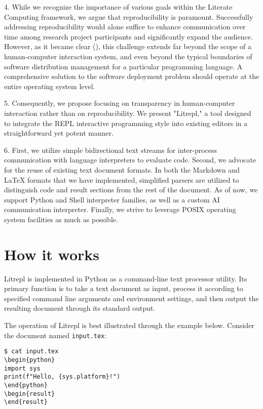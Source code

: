 \documentclass[a4paper,12pt,twocolumn]{article}
\begin{document}
4. While we recognize the importance of various goals within the Literate
Computing framework, we argue that reproducibility is paramount. Successfully
addressing reproducibility would alone suffice to enhance communication over
time among research project participants and significantly expand the audience.
However, as it became clear (\cite{Dolstra2010, Vallet2022}), this challenge
extends far beyond the scope of a human-computer interaction system, and even
beyond the typical boundaries of software distribution management for a
particular programming language. A comprehensive solution to the software
deployment problem should operate at the entire operating system level.


5. Consequently, we propose focusing on transparency in human-computer
interaction rather than on reproducibility. We present "Litrepl," a tool
designed to integrate the REPL interactive programming style into existing
editors in a straightforward yet potent manner.

6. First, we utilize simple bidirectional text streams for inter-process
communication with language interpreters to evaluate code. Second, we advocate
for the reuse of existing text document formats. In both the Markdown and LaTeX
formats that we have implemented, simplified parsers are utilized to distinguish
code and result sections from the rest of the document. As of now, we support
Python and Shell interpreter families, as well as a custom AI communication
interpreter. Finally, we strive to leverage POSIX \cite{POSIX2024} operating
system facilities as much as possible.


\section{How it works}

Litrepl is implemented in Python as a command-line text processor utility. Its
primary function is to take a text document as input, process it according to
specified command line arguments and environment settings, and then output the
resulting document through its standard output.

The operation of Litrepl is best illustrated through the example below. Consider
the document named \verb|input.tex|:

\begin{comment}
\begin{sh}
echo '\begin{verbatim}'
echo '$ cat input.tex'
cat input.tex
echo '\end{verbatim}'
\end{sh}
\end{comment}
\begin{verbatim}
$ cat input.tex
\begin{python}
import sys
print(f"Hello, {sys.platform}!")
\end{python}
\begin{result}
\end{result}
\end{verbatim}
\end{document}

